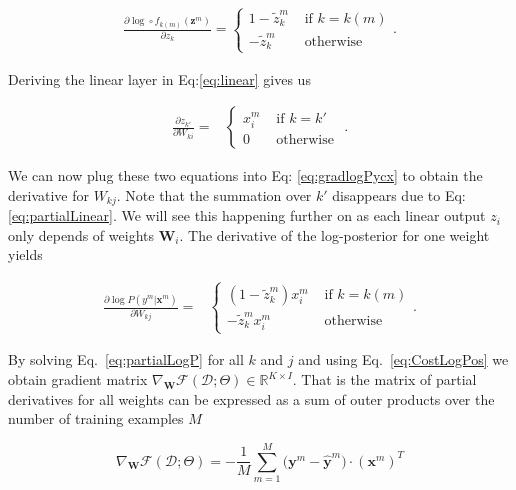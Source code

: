 \begin{align}
\frac{\partial \log \circ f_{k(m)}(\mathbf{z}^m)}{\partial z_{k}} = 
  \begin{cases}
      1 - \tilde{z}_k^m  &  \mbox{ if } k = k(m)\\ 
      -\tilde{z}_k^m    &  \mbox{ otherwise } 
  \end{cases}. 
  \label{eq:patialSoftmax}
\end{align}

\noindent Deriving the linear layer in Eq:\ref{eq:linear} gives us

\begin{align}
\frac{\partial z_{k'}}{\partial W_{ki}} = 
  &\begin{cases}
      x_i^m  &  \mbox{ if } k = k'\\ 
      0    &  \mbox{ otherwise } 
  \end{cases}.
  \label{eq:partialLinear}
\end{align}

We can now plug these two equations into Eq: \ref{eq:gradlogPycx} to obtain the
derivative for $W_{kj}$. Note that the summation over $k'$ disappears due to
Eq:\ref{eq:partialLinear}. We will see this happening further on as each linear
output $z_i$ only depends of weights $\mathbf{W}_i$. The derivative of the
log-posterior for one weight yields 

\begin{align}
\frac{\partial \log P(y^m | \mathbf{x}^m) }{\partial W_{kj}} = 
  &\begin{cases}
     (1 - \tilde{z}_k^m) x_i^m  &  \mbox{ if } k = k(m)\\ 
       -\tilde{z}_k^m x_i^m             &  \mbox{ otherwise } 
  \end{cases}. 
  \label{eq:partialLogP} 
\end{align}

By solving Eq.~\ref{eq:partialLogP} for all $k$ and $j$ and using
Eq.~\ref{eq:CostLogPos} we obtain gradient matrix
$\nabla_\mathbf{W}\mathcal{F}(\mathcal{D};\Theta) \in \mathbb{R}^{K \times I}$.
That is the matrix of partial derivatives for all weights can be expressed as a
sum of outer products over the number of training examples $M$  

\begin{equation}
\nabla_\mathbf{W}\mathcal{F}(\mathcal{D};\Theta) = -\frac{1}{M}\sum_{m=1}^M \Big(\mathbf{y}^m - \hat{\mathbf{y}}^m \Big) \cdot \left(\mathbf{x}^m\right)^T  
\label{gradWeigths}
\end{equation}

